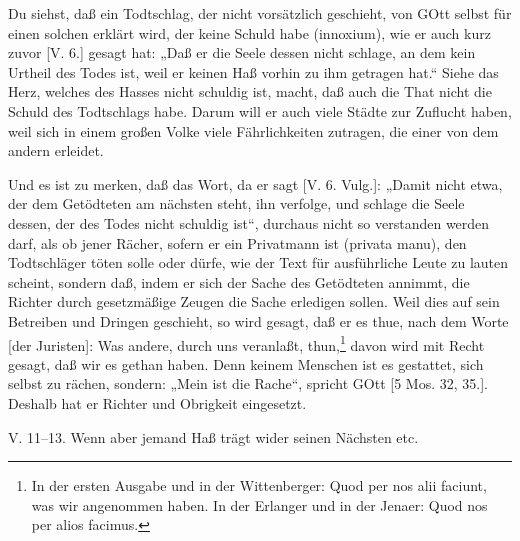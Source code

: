 Du siehst, daß ein Todtschlag, der nicht vorsätzlich geschieht, von GOtt selbst für einen solchen erklärt wird, der keine Schuld habe (innoxium), wie er auch kurz zuvor [V. 6.] gesagt hat: „Daß
er die Seele dessen nicht schlage, an dem kein Urtheil des Todes ist, weil er keinen Haß vorhin zu ihm getragen hat.“ Siehe das Herz, welches des Hasses nicht schuldig ist, macht, daß auch die That nicht die Schuld des Todtschlags habe. Darum will er auch viele Städte zur Zuflucht haben, weil sich in einem großen Volke viele Fährlichkeiten zutragen, die einer von dem andern erleidet.

Und es ist zu merken, daß das Wort, da er sagt [V. 6. Vulg.]: „Damit nicht etwa, der dem Getödteten am nächsten steht, ihn verfolge, und schlage die Seele dessen, der des Todes nicht schuldig ist“, durchaus nicht so verstanden werden darf, als ob jener Rächer, sofern er ein Privatmann ist (privata manu), den Todtschläger töten solle oder dürfe, wie der Text für ausführliche Leute zu lauten scheint, sondern daß, indem er sich der Sache des Getödteten annimmt, die Richter durch gesetzmäßige Zeugen die Sache erledigen sollen. Weil dies auf sein Betreiben und Dringen geschieht, so wird gesagt, daß er es thue, nach dem Worte [der Juristen]: Was andere, durch uns veranlaßt, thun,\footnote{In der ersten Ausgabe und in der Wittenberger: Quod per nos alii faciunt, was wir angenommen haben. In der Erlanger und in der Jenaer: Quod nos per alios facimus.} davon wird mit Recht gesagt, daß wir es gethan haben. Denn keinem Menschen ist es gestattet, sich selbst zu rächen, sondern: „Mein ist die Rache“, spricht GOtt [5 Mos. 32, 35.]. Deshalb hat er Richter und Obrigkeit eingesetzt.

\begin{schriftzitat}
V. 11–13. Wenn aber jemand Haß trägt wider seinen Nächsten etc.
\end{schriftzitat}

